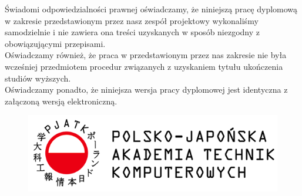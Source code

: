 \documentclass[a4paper,11pt]{report}
\begin{document}
Świadomi odpowiedzialności prawnej oświadczamy, że niniejszą pracę dyplomową w zakresie przedstawionym przez nasz zespół projektowy wykonaliśmy samodzielnie i nie zawiera ona treści uzyskanych w sposób niezgodny z obowiązującymi przepisami.\\
Oświadczamy również, że praca w przedstawionym przez nas zakresie nie była wcześniej przedmiotem procedur związanych z uzyskaniem tytułu ukończenia studiów wyższych.\\
Oświadczamy ponadto, że niniejsza wersja pracy dyplomowej jest identyczna z załączoną wersją elektroniczną.\\
\newpage
\begin{figure}[ht]
	\centering
	\includegraphics{pjatk}
\end{figure}
\end{document}
